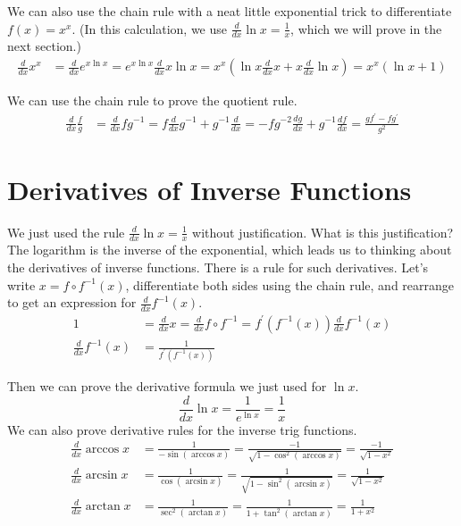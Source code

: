 \documentclass[fleqn]{report}
\begin{document}
\begin{example}
We can also use the chain rule with a neat little exponential
trick to differentiate $f(x) = x^x$. (In
this calculation, we use $\frac{d}{dx} \ln x = \frac{1}{x}$,
which we will prove in the next section.)
\begin{align*}
\frac{d}{dx} x^x & = \frac{d}{dx} e^{x\ln x} = e^{x\ln x}
\frac{d}{dx} x\ln x = x^x (\ln x \frac{d}{dx} x + x
\frac{d}{dx} \ln x) = x^x(\ln x + 1) 
\end{align*}
\end{example}

\begin{example}
We can use the chain rule to prove the quotient rule.
\begin{align*}
\frac{d}{dx} \frac{f}{g} & = \frac{d}{dx} f g^{-1} = 
f \frac{d}{dx} g^{-1} + g^{-1} \frac{d}{dx} = 
-f g^{-2} \frac{dg}{dx} + g^{-1} \frac{df}{dx} = \frac{gf^\prime -
fg^\prime}{g^2} 
\end{align*}
\end{example}

\section*{Derivatives of Inverse Functions}

We just used the rule $\frac{d}{dx} \ln x = \frac{1}{x}$
without justification. What is this justification? The
logarithm is the inverse of the exponential, which leads us to
thinking about the derivatives of inverse functions. There is
a rule for such derivatives. Let's write $x = f \circ
f^{-1}(x)$, differentiate both sides using the chain rule, and
rearrange to get an expression for $\frac{d}{dx} f^{-1}(x)$. 
\begin{align*}
1 & = \frac{d}{dx} x = \frac{d}{dx} f \circ f^{-1} = f^\prime (
f^{-1}(x)) \frac{d}{dx} f^{-1}(x) \\
\frac{d}{dx} f^{-1}(x) & = \frac{1}{f^\prime(f^{-1}(x))}
\end{align*}

Then we can prove the derivative formula we just used for $\ln
x$.
\begin{equation*}
\frac{d}{dx} \ln x = \frac{1}{e^{\ln x}} = \frac{1}{x} 
\end{equation*}
We can also prove derivative rules for the inverse trig
functions.
\begin{align*}
\frac{d}{dx} \arccos x & = \frac{1}{-\sin(\arccos x)} =
\frac{-1}{\sqrt{1-\cos^2(\arccos x)}} = \frac{-1}{\sqrt{1-x^2}} \\
\frac{d}{dx} \arcsin x & = \frac{1}{\cos(\arcsin x)} =
\frac{1}{\sqrt{1-\sin^2(\arcsin x)}} = \frac{1}{\sqrt{1-x^2}} \\
\frac{d}{dx} \arctan x & = \frac{1}{\sec^2(\arctan x)} =
\frac{1}{1+\tan^2(\arctan x)} = \frac{1}{1+x^2} 
\end{align*}
\clearpage
\end{document}
